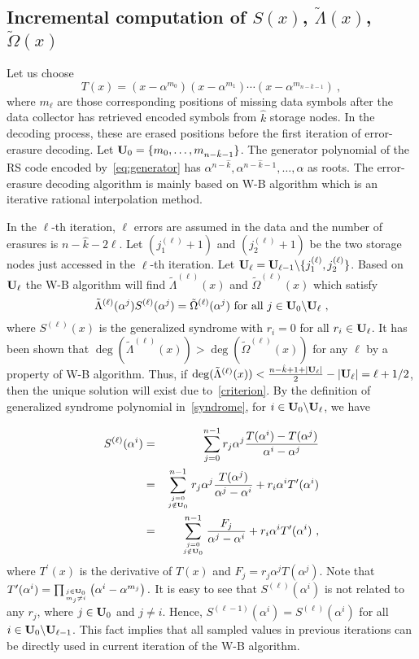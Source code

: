 \documentclass[10pt,journal,letterpaper,compsoc]{IEEEtran}
\newcommand{\nn}{\nonumber}
\newcommand{\0}{{\bf 0}}
\begin{document}
\subsection{Incremental computation of $S(x)$, $\tilde\Lambda(x)$, $\tilde\Omega(x)$}
Let us choose
$$T(x)=\left(x-\alpha^{m_0}\right)\left(x-\alpha^{m_1}\right)\cdots\left(x-\alpha^{m_{n-\hat{k}-1}}\right)~,$$
where $m_\ell$ are those corresponding positions of missing data symbols after
the data collector has retrieved encoded symbols from $\hat{k}$ storage nodes. In the
decoding process, these are erased positions before the first iteration of
error-erasure decoding. Let ${\bf U}_0=\{m_0,\ldots,m_{n-\hat{k}-1}\}$.
The generator polynomial of the RS code encoded by~\eqref{eq:generator}
has $\alpha^{n-\hat{k}},\alpha^{n-\hat{k}-1},\ldots, \alpha$ as roots.
The error-erasure decoding algorithm is mainly based on W-B algorithm which is
an iterative rational interpolation method.

In the $\ell$-th iteration, $\ell$ errors are assumed in the data and the
number of erasures is $n-\hat{k}-2\ell$. Let $(j^{(\ell)}_1+1)$ and $(j^{(\ell)}_2+1)$ be the two storage nodes just accessed in the $\ell$-th iteration. Let ${\bf U}_\ell={\bf U}_{\ell-1}\backslash \{j^{(\ell)}_1,j^{(\ell)}_2\}$. Based on ${\bf U}_\ell$ the W-B algorithm will find $\tilde\Lambda^{(\ell)}(x)$ and $\tilde\Omega^{(\ell)}(x)$ which satisfy
$$\tilde\Lambda^{(\ell)}(\alpha^j)S^{(\ell)}(\alpha^j)=\tilde\Omega^{(\ell)}(\alpha^j)\mbox{ for all }j\in {\bf U}_0\backslash {\bf U}_{\ell}~,$$ where $S^{(\ell)}(x)$ is the generalized syndrome with $r_i=0$ for all $r_i\in {\bf U}_\ell$. It has been shown that $\deg(\tilde\Lambda^{(\ell)}(x))> \deg(\tilde\Omega^{(\ell)}(x))$ for any $\ell$ by a property of W-B algorithm. Thus, if $\deg(\tilde\Lambda^{(\ell)}(x))<\frac{n-\hat{k}+1+|{\bf U}_\ell|}{2}-|{\bf U}_\ell|=\ell+1/2$, then the unique solution will exist due to~\eqref{criterion}. By the definition of generalized syndrome polynomial in~\eqref{syndrome}, for $i\in {\bf U}_0\backslash {\bf U}_\ell$, we have

\begin{eqnarray}
S^{(\ell)}(\alpha^i)&=&\sum_{j=0}^{n-1}r_j\alpha^j\frac{T(\alpha^i)-T(\alpha^j)}{\alpha^i-\alpha^j}\nn\\
&=&\sum_{j=0\atop j\notin {\bf U}_0}^{n-1}r_j\alpha^j\frac{T(\alpha^j)}{\alpha^j-\alpha^i}+r_i\alpha^iT^\prime(\alpha^i)\nn\\
&=&\sum_{j=0\atop j\notin {\bf U}_0}^{n-1}\frac{F_j}{\alpha^j-\alpha^i}+r_i\alpha^iT^\prime(\alpha^i)~,\label{syndrome_j}
\end{eqnarray}
where $T^\prime(x)$ is the derivative of $T(x)$ and $F_j=r_j\alpha^jT(\alpha^j)$. Note that $T^\prime(\alpha^i)=\prod_{j\in {\bf U}_0\atop m_j\neq i}\left(\alpha^i-\alpha^{m_j}\right).$ It is easy to see that $S^{(\ell)}(\alpha^i)$ is not related to any $r_j$, where $j\in {\bf U}_0$ and $j\neq i$. Hence, $S^{(\ell-1)}(\alpha^i)=S^{(\ell)}(\alpha^i)$ for all $i\in {\bf U}_0\backslash {\bf U}_{\ell-1}$. This fact implies that all sampled values in previous iterations can be directly used in current iteration of the W-B algorithm.
\end{document}

